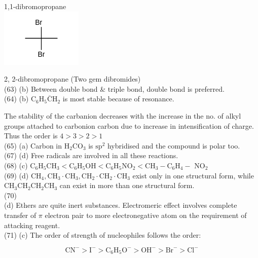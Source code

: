\documentclass[10pt]{article}
\begin{document}
1,1-dibromopropane\\
\includegraphics{smile-1c9fbcc5571b1d9e92b9234f1a403d3b150b353d}

2, 2-dibromopropane (Two gem dibromides)\\
(63) (b) Between double bond \& triple bond, double bond is preferred.\\
(64) (b) $\mathrm{C}_{6} \mathrm{H}_{5} \overline{\mathrm{C}} \mathrm{H}_{2}$ is most stable because of resonance.

The stability of the carbanion decreases with the increase in the no. of alkyl groups attached to carbonion carbon due to increase in intensification of charge. Thus the order is $4>3>2>1$\\
(65) (a) Carbon in $\mathrm{H}_{2} \mathrm{CO}_{3}$ is $\mathrm{sp}^{2}$ hybridised and the compound is polar too.\\
(67) (d) Free radicals are involved in all these reactions.\\
(68) (c) $\mathrm{C}_{6} \mathrm{H}_{5} \mathrm{CH}_{3}<\mathrm{C}_{6} \mathrm{H}_{5} \mathrm{OH}<\mathrm{C}_{6} \mathrm{H}_{5} \mathrm{NO}_{2}<\mathrm{CH}_{3}-\mathrm{C}_{6} \mathrm{H}_{4}-$ $\mathrm{NO}_{2}$\\
(69) (d) $\mathrm{CH}_{4}, \mathrm{CH}_{3} \cdot \mathrm{CH}_{3}, \mathrm{CH}_{2} \cdot \mathrm{CH}_{2} \cdot \mathrm{CH}_{3}$ exist only in one structural form, while $\mathrm{CH}_{3} \mathrm{CH}_{2} \mathrm{CH}_{2} \mathrm{CH}_{3}$ can exist in more than one structural form.\\
(70)\\
(d) Ethers are quite inert substances. Electromeric effect involves complete transfer of $\pi$ electron pair to more electronegative atom on the requirement of attacking reagent.\\
(71) (c) The order of strength of nucleophiles follows the order:

$$
\mathrm{CN}^{-}>\mathrm{I}^{-}>\mathrm{C}_{6} \mathrm{H}_{5} \mathrm{O}^{-}>\mathrm{OH}^{-}>\mathrm{Br}^{-}>\mathrm{Cl}^{-}
$$
\end{document}
